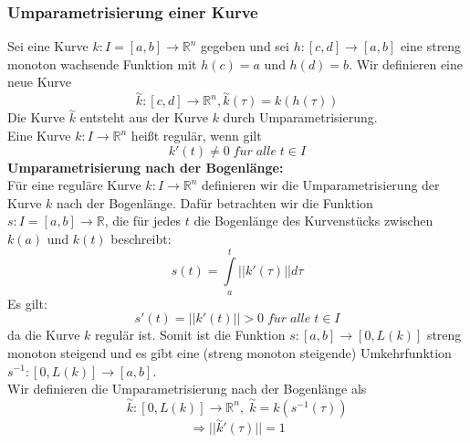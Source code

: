 \documentclass[a4paper,twocolumn,10pt]{article}
\begin{document}
\subsubsection{Umparametrisierung einer Kurve}
Sei eine Kurve $k:I=[a,b]\rightarrow\mathbb{R}^n$ gegeben und sei $h:[c,d]\rightarrow[a,b]$ eine streng monoton wachsende Funktion mit $h(c)=a$ und $h(d)=b$. Wir definieren eine neue Kurve
\begin{equation*}
\overset{\sim}{k}:[c,d]\rightarrow\mathbb{R}^n, \overset{\sim}{k}(\tau)=k(h(\tau))
\end{equation*}
Die Kurve $\overset{\sim}{k}$ entsteht aus der Kurve $k$ durch Umparametrisierung.\\
Eine Kurve $k:I\rightarrow\mathbb{R}^n$ heißt regulär, wenn gilt
\begin{equation*}
k'(t)\neq 0\;f\ddot{u}r\;alle\;t\in I
\end{equation*}
\textbf{Umparametrisierung nach der Bogenlänge:}\\
Für eine reguläre Kurve $k:I\rightarrow\mathbb{R}^n$ definieren wir die Umparametrisierung der Kurve $k$ nach der Bogenlänge. Dafür betrachten wir die Funktion $s:I=[a,b]\rightarrow\mathbb{R}$, die für jedes $t$ die Bogenlänge des Kurvenstücks zwischen $k(a)$ und $k(t)$ beschreibt:
\begin{equation*}
s(t)=\int\limits_{a}^{t}||k'(\tau)||d\tau
\end{equation*}
Es gilt:
\begin{equation*}
s'(t)=||k'(t)||>0\;f\ddot{u}r\;alle\;t\in I
\end{equation*}
da die Kurve $k$ regulär ist. Somit ist die Funktion $s:[a,b]\rightarrow [0,L(k)]$ streng monoton steigend und es gibt eine (streng monoton steigende) Umkehrfunktion $s^{-1}:[0,L(k)]\rightarrow [a,b]$.\\
Wir definieren die Umparametrisierung nach der Bogenlänge als
\begin{equation*}
\overset{\sim}{k}:[0,L(k)]\rightarrow\mathbb{R}^n,\;\overset{\sim}{k}=k(s^{-1}(\tau))
\end{equation*}
\begin{equation*}
\Rightarrow ||\overset{\sim}{k}'(\tau)||=1
\end{equation*}
\end{document}
